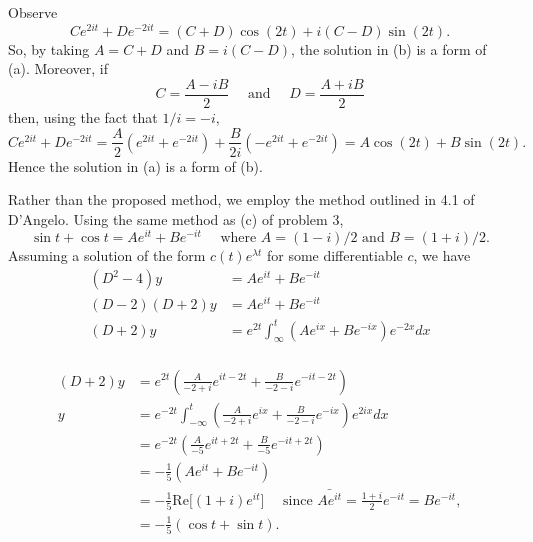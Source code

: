 \documentclass{homework}
\begin{document}
Observe
$$
  Ce^{2it} + De^{-2it} = (C+D)\cos(2t) + i(C-D)\sin(2t).
$$
So, by taking $A = C+D$ and $B = i(C-D)$, the solution in (b) is a form of (a).  Moreover, if 
$$
  C = \frac{A-iB}{2}\quad \text{ and }\quad D = \frac{A + iB}{2} 
$$
then, using the fact that $1/i = -i$, 
$$
  Ce^{2it} + De^{-2it} = \frac A2(e^{2it} + e^{-2it}) + \frac{B}{2i}(-e^{2it} + e^{-2it}) = A\cos(2t) + B\sin(2t).
$$
Hence the solution in (a) is a form of (b).
%



Rather than the proposed method, we employ the method outlined in 4.1 of D'Angelo.  Using the same method as (c) of problem 3,  
$$
\sin t + \cos t = A e^{it} + Be^{-it}\quad\text{ where $A = (1-i)/2$ and $B = (1+i)/2$.}
$$
Assuming a solution of the form $c(t)e^{\lambda t}$ for some differentiable $c$, we have
\enlargethispage{1em}
\begin{align*}
  (D^2 - 4) y &= Ae^{it} + Be^{-it} \\
  (D - 2)(D+2) y&= Ae^{it} + Be^{-it} \\
  (D+2) y&= e^{2t}\int_{\infty}^t (Ae^{ix} + Be^{-ix})e^{-2x}dx\\
\end{align*}

\newpage
\begin{align*}
  (D+2) y&= e^{2t}\left(\frac{A}{-2+i}e^{it-2t} + \frac B{-2-i}e^{-it-2t}\right)\\
  y&= e^{-2t}\int_{-\infty}^t \left(\frac{A}{-2+i}e^{ix} + \frac B{-2-i} e^{-ix}\right) e^{2ix} dx\\
  &= e^{-2t}\left( \frac A{-5} e^{it+2t} + \frac{B}{-5}e^{-it + 2t} \right)\\
  &= -\frac {1}{5}\left( Ae^{it} + Be^{-it} \right)\\
  &= -\frac 15 \mathrm{Re}\big[ (1+i)e^{it} \big] \quad \text{ since }\bar{Ae^{it}} = \frac{1+i}2e^{-it} = Be^{-it},\\
  &= -\frac 15( \cos t + \sin t).
\end{align*}
\end{document}
